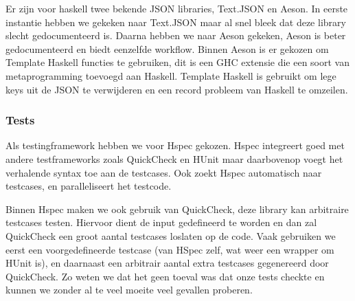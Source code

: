 Er zijn voor haskell twee bekende JSON libraries, Text.JSON en Aeson. In eerste instantie hebben we gekeken naar Text.JSON maar al snel bleek dat deze library slecht gedocumenteerd is. Daarna hebben we naar Aeson gekeken, Aeson is beter gedocumenteerd en biedt eenzelfde workflow.
Binnen Aeson is er gekozen om Template Haskell functies te gebruiken, dit is een GHC extensie die een soort van metaprogramming toevoegd aan Haskell. Template Haskell is gebruikt om lege keys uit de JSON te verwijderen en een record probleem van Haskell te omzeilen.

\subsubsection{Tests}
Als testingframework hebben we voor Hspec gekozen. Hspec integreert goed met andere testframeworks zoals QuickCheck en HUnit maar daarbovenop voegt het verhalende syntax toe aan de testcases. Ook zoekt Hspec automatisch naar testcases, en paralleliseert het testcode.

Binnen Hspec maken we ook gebruik van QuickCheck, deze library kan arbitraire testcases testen. Hiervoor dient de input gedefineerd te worden en dan zal QuickCheck een groot aantal testcases loslaten op de code. Vaak gebruiken we eerst een voorgedefineerde testcase (van HSpec zelf, wat weer een wrapper om HUnit is), en daarnaast een arbitrair aantal extra testcases gegenereerd door QuickCheck. Zo weten we dat het geen toeval was dat onze tests checkte en kunnen we zonder al te veel moeite veel gevallen proberen.
